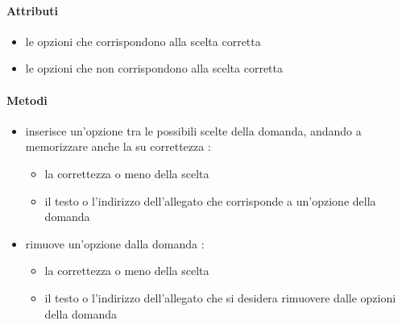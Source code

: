 \paragraph{Attributi}
\begin{itemize}
\item {}
\newline
le opzioni che corrispondono alla scelta corretta
\item {}
\newline
le opzioni che non corrispondono alla scelta corretta
\end{itemize}
\paragraph{Metodi}
\begin{itemize}
\item {}
\newline
inserisce un'opzione tra le possibili scelte della domanda, andando a memorizzare anche la su correttezza
\newline
{} :
\begin{itemize}
\item {}
\newline
la correttezza o meno della scelta
\item {}
\newline
il testo o l'indirizzo dell'allegato che corrisponde a un'opzione della domanda
\end{itemize}
\item {}
\newline
rimuove un'opzione dalla domanda
\newline
{} :
\begin{itemize}
\item {}
\newline
la correttezza o meno della scelta
\item {}
\newline
il testo o l'indirizzo dell'allegato che si desidera rimuovere dalle opzioni della domanda
\end{itemize}
\end{itemize}
